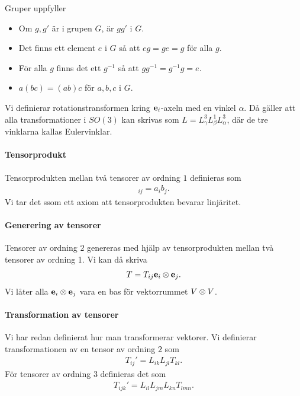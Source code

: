 Gruper uppfyller
\begin{itemize}
	\item Om $g, g'$ är i grupen $G$, är $gg'$ i $G$.
	\item Det finns ett element $e$ i $G$ så att $eg = ge = g$ för alla $g$.
	\item För alla $g$ finns det ett $g^{-1}$ så att $gg^{-1} = g^{-1}g = e$.
	\item $a(bc) = (ab)c$ för $a, b, c$ i $G$.
\end{itemize}

Vi definierar rotationstransformen kring $\vb{e}_{i}$-axeln med en vinkel $\alpha$. Då gäller att alla transformationer i $SO(3)$ kan skrivas som $L = L_{\gamma}^{3}L_{\beta}^{1}L_{\alpha}^{3}$, där de tre vinklarna kallas Eulervinklar.

\paragraph{Tensorprodukt}
Tensorprodukten mellan två tensorer av ordning $1$ definieras som
\begin{align*}
	[\tenprod{\vb{a}}{\vb{b}}]_{ij} = a_ib_j.
\end{align*}
Vi tar det ssom ett axiom att tensorprodukten bevarar linjäritet.

\paragraph{Generering av tensorer}
Tensorer av ordning $2$ genereras med hjälp av tensorprodukten mellan två tensorer av ordning 1. Vi kan då skriva
\begin{align*}
	T = T_{ij}\vb{e}_i\otimes \vb{e}_j.
\end{align*}
Vi låter alla $\vb{e}_i\otimes \vb{e}_j$ vara en bas för vektorrummet $V\otimes V$.

\paragraph{Transformation av tensorer}
Vi har redan definierat hur man transformerar vektorer. Vi definierar transformationen av en tensor av ordning $2$ som
\begin{align*}
	T_{ij}' = L_{ik}L_{jl}T_{kl}.
\end{align*}
För tensorer av ordning $3$ definieras det som
\begin{align*}
	T_{ijk}' = L_{il}L_{jm}L_{kn}T_{lmn}.
\end{align*}